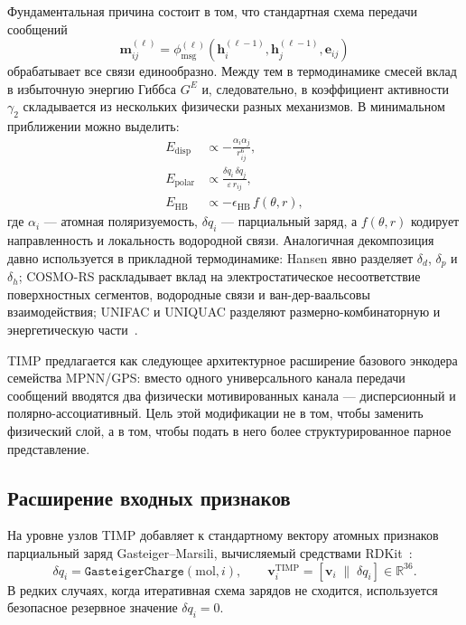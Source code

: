 \documentclass[11pt]{article}
\begin{document}
Фундаментальная причина состоит в том, что стандартная схема передачи сообщений
\begin{equation*}
\mathbf{m}_{ij}^{(\ell)} = \phi_{\mathrm{msg}}^{(\ell)}\!\left(\mathbf{h}_i^{(\ell-1)},\mathbf{h}_j^{(\ell-1)},\mathbf{e}_{ij}\right)
\end{equation*}
обрабатывает все связи единообразно. Между тем в термодинамике смесей вклад в избыточную энергию Гиббса $G^E$ и, следовательно, в коэффициент активности $\gamma_2$ складывается из нескольких физически разных механизмов. В минимальном приближении можно выделить:
\begin{align*}
E_{\mathrm{disp}} &\propto -\frac{\alpha_i\alpha_j}{r_{ij}^6}, \\
E_{\mathrm{polar}} &\propto \frac{\delta q_i\,\delta q_j}{\varepsilon\,r_{ij}}, \\
E_{\mathrm{HB}} &\propto -\epsilon_{\mathrm{HB}}\,f(\theta,r),
\end{align*}
где $\alpha_i$ --- атомная поляризуемость, $\delta q_i$ --- парциальный заряд, а $f(\theta,r)$ кодирует направленность и локальность водородной связи. Аналогичная декомпозиция давно используется в прикладной термодинамике: Hansen явно разделяет $\delta_d$, $\delta_p$ и $\delta_h$; COSMO-RS раскладывает вклад на электростатическое несоответствие поверхностных сегментов, водородные связи и ван-дер-ваальсовы взаимодействия; UNIFAC и UNIQUAC разделяют размерно-комбинаторную и энергетическую части~\cite{hansen2007,klamt2017,weidlich1987,abrams1975}.

TIMP предлагается как следующее архитектурное расширение базового энкодера семейства MPNN/GPS: вместо одного универсального канала передачи сообщений вводятся два физически мотивированных канала --- дисперсионный и полярно-ассоциативный. Цель этой модификации не в том, чтобы заменить физический слой, а в том, чтобы подать в него более структурированное парное представление.

\subsection{Расширение входных признаков}

На уровне узлов TIMP добавляет к стандартному вектору атомных признаков парциальный заряд Gasteiger--Marsili, вычисляемый средствами RDKit~\cite{landrum2024}:
\begin{equation*}
\delta q_i = \texttt{GasteigerCharge}(\mathrm{mol}, i),
\qquad
\mathbf{v}_i^{\mathrm{TIMP}} = [\mathbf{v}_i \;\|\; \delta q_i] \in \mathbb{R}^{36}.
\end{equation*}
В редких случаях, когда итеративная схема зарядов не сходится, используется безопасное резервное значение $\delta q_i = 0$.
\end{document}
